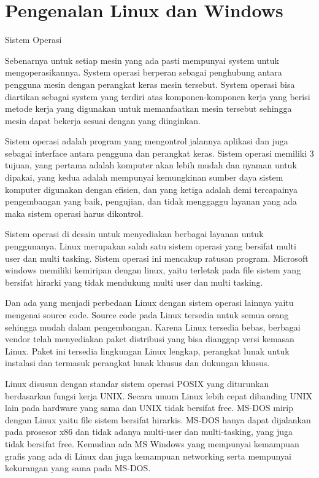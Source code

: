 
\section{Pengenalan Linux dan Windows}
Sistem Operasi

Sebenarnya untuk setiap mesin yang ada pasti mempunyai system untuk mengoperasikannya. System operasi berperan sebagai penghubung antara pengguna mesin dengan perangkat keras mesin tersebut. System operasi bisa diartikan sebagai system yang terdiri atas komponen-komponen kerja yang berisi metode kerja yang digunakan untuk memanfaatkan mesin tersebut sehingga mesin dapat bekerja sesuai dengan yang diinginkan.

Sistem operasi  adalah program yang mengontrol jalannya aplikasi dan juga sebagai interface antara pengguna dan perangkat keras. Sistem operasi memiliki 3 tujuan, yang pertama adalah komputer akan lebih mudah dan nyaman untuk dipakai, yang kedua adalah mempunyai kemungkinan sumber daya sistem komputer digunakan dengan efisien, dan yang ketiga adalah demi tercapainya pengembangan yang baik, pengujian, dan tidak menggaggu layanan yang ada maka sistem operasi harus dikontrol.

Sistem operasi di desain untuk menyediakan berbagai layanan untuk penggunanya. Linux merupakan salah satu sistem operasi yang bersifat multi user dan multi tasking. Sistem operasi ini mencakup ratusan program. Microsoft windows memiliki kemiripan dengan linux, yaitu terletak pada file sistem yang bersifat hirarki yang tidak mendukung multi user dan multi tasking.

Dan ada yang menjadi perbedaan Linux dengan sistem operasi lainnya yaitu mengenai source code. Source code pada Linux tersedia untuk semua orang sehingga mudah dalam pengembangan. Karena Linux tersedia bebas, berbagai vendor telah menyediakan paket distribusi yang bisa dianggap versi kemasan Linux. Paket ini tersedia lingkungan Linux lengkap, perangkat lunak untuk instalasi dan termasuk perangkat lunak khusus dan dukungan khusus.

Linux disusun dengan standar sistem operasi POSIX yang diturunkan berdasarkan fungsi kerja UNIX. Secara umum Linux lebih cepat dibanding UNIX lain pada hardware yang sama dan UNIX tidak bersifat free.
MS-DOS mirip dengan Linux yaitu file sistem bersifat hirarkis. MS-DOS hanya dapat dijalankan pada prosesor x86 dan tidak adanya multi-user dan multi-tasking, yang juga tidak bersifat free. Kemudian ada MS Windows yang mempunyai kemampuan grafis yang ada di Linux dan juga kemampuan networking serta mempunyai kekurangan yang sama pada MS-DOS.


